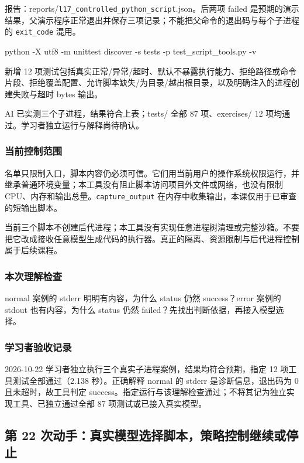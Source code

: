 \documentclass[UTF8,zihao=-4,fontset=fandol]{ctexart}
\begin{document}
报告：reports/\nolinkurl{l17_controlled_python_script}.json。后两项 failed 是预期的演示结果，父演示程序正常退出并保存三项记录；不能把父命令的退出码与每个子进程的 \nolinkurl{exit_code} 混用。

\begin{Code}
python -X utf8 -m unittest discover -s tests -p test_script_tools.py -v
\end{Code}

新增 12 项测试包括真实正常/异常/超时、默认不暴露执行能力、拒绝路径或命令片段、拒绝覆盖配置、允许脚本缺失/为目录/越出根目录，以及明确注入的进程创建失败与超时 bytes 输出。

AI 已实测三个子进程，结果符合上表；tests/ 全部 87 项、exercises/ 12 项均通过。学习者独立运行与解释尚待确认。

\subsubsection{当前控制范围}

名单只限制入口，脚本内容仍必须可信。它们用当前用户的操作系统权限运行，并继承普通环境变量；本工具没有阻止脚本访问项目外文件或网络，也没有限制 CPU、内存和输出总量。\nolinkurl{capture_output} 在内存中收集输出，本课仅用于已审查的短输出脚本。

当前三个脚本不创建后代进程；本工具没有实现任意进程树清理或完整沙箱。不要把它改成接收任意模型生成代码的执行器。真正的隔离、资源限制与后代进程控制属于后续课程。

\subsubsection{本次理解检查}

normal 案例的 stderr 明明有内容，为什么 status 仍然 success？error 案例的 stdout 也有内容，为什么 status 仍然 failed？先找出判断依据，再接入模型选择。

\subsubsection{学习者验收记录}

2026-10-22 学习者独立执行三个真实子进程案例，结果均符合预期，指定 12 项工具测试全部通过（2.138 秒）。正确解释 normal 的 stderr 是诊断信息，退出码为 0 且未超时，故工具判定 success。指定运行与该理解检查通过；不将其记为独立实现工具、已独立通过全部 87 项测试或已接入真实模型。

\subsection{第 22 次动手：真实模型选择脚本，策略控制继续或停止}
\end{document}
